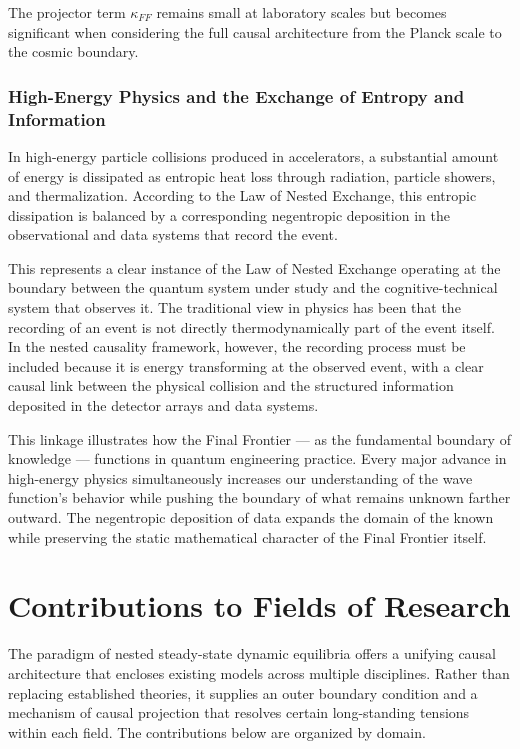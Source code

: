 \begin{sloppypar}
The projector term $\kappa_{FF}$ remains small at laboratory scales but becomes significant when considering the full causal architecture from the Planck scale to the cosmic boundary.

\subsection{High-Energy Physics and the Exchange of Entropy and Information}

In high-energy particle collisions produced in accelerators, a substantial amount of energy is dissipated as entropic heat loss through radiation, particle showers, and thermalization. According to the Law of Nested Exchange, this entropic dissipation is balanced by a corresponding negentropic deposition in the observational and data systems that record the event.

This represents a clear instance of the Law of Nested Exchange operating at the boundary between the quantum system under study and the cognitive-technical system that observes it. The traditional view in physics has been that the recording of an event is not directly thermodynamically part of the event itself. In the nested causality framework, however, the recording process must be included because it is energy transforming at the observed event, with a clear causal link between the physical collision and the structured information deposited in the detector arrays and data systems.

This linkage illustrates how the Final Frontier — as the fundamental boundary of knowledge — functions in quantum engineering practice. Every major advance in high-energy physics simultaneously increases our understanding of the wave function’s behavior while pushing the boundary of what remains unknown farther outward. The negentropic deposition of data expands the domain of the known while preserving the static mathematical character of the Final Frontier itself.

\end{sloppypar}

\chapter{Contributions to Fields of Research}

The paradigm of nested steady-state dynamic equilibria offers a unifying causal architecture that encloses existing models across multiple disciplines. Rather than replacing established theories, it supplies an outer boundary condition and a mechanism of causal projection that resolves certain long-standing tensions within each field. The contributions below are organized by domain.

